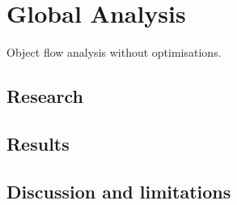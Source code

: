 \documentclass[../main.tex]{subfiles}
\begin{document}
    \chapter{Global Analysis}\label{chap:global_analysis}
        Object flow analysis without optimisations.
        
    \section{Research}\label{sec:ga_research}

    \section{Results}\label{sec:ga_results}

    \section{Discussion and limitations}\label{sec:ga_discussion}
        
\end{document}
